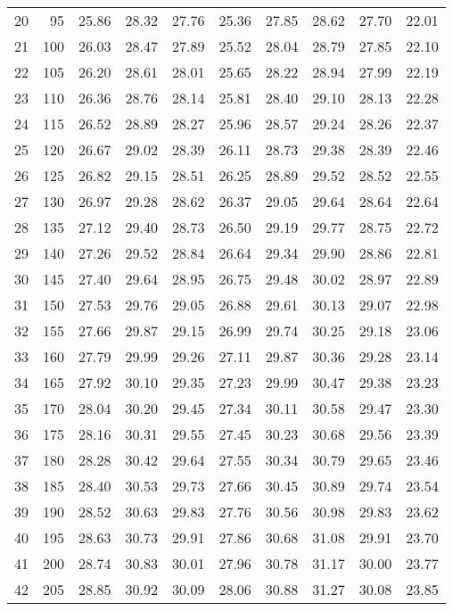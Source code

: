 \begin{longtable}{rrllllllll}
20 & 95 & 25.86 & 28.32 & 27.76 & 25.36 & 27.85 & 28.62 & 27.70 & 22.01 \\ 
21 & 100 & 26.03 & 28.47 & 27.89 & 25.52 & 28.04 & 28.79 & 27.85 & 22.10 \\ 
22 & 105 & 26.20 & 28.61 & 28.01 & 25.65 & 28.22 & 28.94 & 27.99 & 22.19 \\ 
23 & 110 & 26.36 & 28.76 & 28.14 & 25.81 & 28.40 & 29.10 & 28.13 & 22.28 \\ 
24 & 115 & 26.52 & 28.89 & 28.27 & 25.96 & 28.57 & 29.24 & 28.26 & 22.37 \\ 
25 & 120 & 26.67 & 29.02 & 28.39 & 26.11 & 28.73 & 29.38 & 28.39 & 22.46 \\ 
26 & 125 & 26.82 & 29.15 & 28.51 & 26.25 & 28.89 & 29.52 & 28.52 & 22.55 \\ 
27 & 130 & 26.97 & 29.28 & 28.62 & 26.37 & 29.05 & 29.64 & 28.64 & 22.64 \\ 
28 & 135 & 27.12 & 29.40 & 28.73 & 26.50 & 29.19 & 29.77 & 28.75 & 22.72 \\ 
29 & 140 & 27.26 & 29.52 & 28.84 & 26.64 & 29.34 & 29.90 & 28.86 & 22.81 \\ 
30 & 145 & 27.40 & 29.64 & 28.95 & 26.75 & 29.48 & 30.02 & 28.97 & 22.89 \\ 
31 & 150 & 27.53 & 29.76 & 29.05 & 26.88 & 29.61 & 30.13 & 29.07 & 22.98 \\ 
32 & 155 & 27.66 & 29.87 & 29.15 & 26.99 & 29.74 & 30.25 & 29.18 & 23.06 \\ 
33 & 160 & 27.79 & 29.99 & 29.26 & 27.11 & 29.87 & 30.36 & 29.28 & 23.14 \\ 
34 & 165 & 27.92 & 30.10 & 29.35 & 27.23 & 29.99 & 30.47 & 29.38 & 23.23 \\ 
35 & 170 & 28.04 & 30.20 & 29.45 & 27.34 & 30.11 & 30.58 & 29.47 & 23.30 \\ 
36 & 175 & 28.16 & 30.31 & 29.55 & 27.45 & 30.23 & 30.68 & 29.56 & 23.39 \\ 
37 & 180 & 28.28 & 30.42 & 29.64 & 27.55 & 30.34 & 30.79 & 29.65 & 23.46 \\ 
38 & 185 & 28.40 & 30.53 & 29.73 & 27.66 & 30.45 & 30.89 & 29.74 & 23.54 \\ 
39 & 190 & 28.52 & 30.63 & 29.83 & 27.76 & 30.56 & 30.98 & 29.83 & 23.62 \\ 
40 & 195 & 28.63 & 30.73 & 29.91 & 27.86 & 30.68 & 31.08 & 29.91 & 23.70 \\ 
41 & 200 & 28.74 & 30.83 & 30.01 & 27.96 & 30.78 & 31.17 & 30.00 & 23.77 \\ 
42 & 205 & 28.85 & 30.92 & 30.09 & 28.06 & 30.88 & 31.27 & 30.08 & 23.85 \\ 

\end{longtable}
